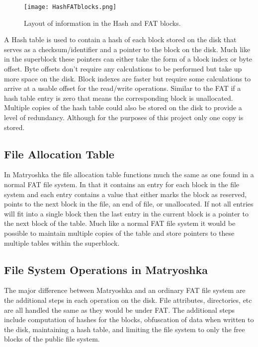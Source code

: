 \documentclass{article}
\begin{document}
\begin{multicols}{2}
\begin{figure*}
  \centering
  \texttt{[image: HashFATblocks.png]}
  \caption{Layout of information in the Hash and FAT blocks.}
  \label{fig:design2}
  \endcenter
\end{figure*}

A Hash table is used to contain a hash of each block stored on the disk that serves as a checksum/identifier and a pointer to the block on the disk. Much like in the superblock these pointers can either take the form of a block index or byte offset. Byte offsets don't require any calculations to be performed but take up more space on the disk. Block indexes are faster but require some calculations to arrive at a usable offset for the read/write operations. Similar to the FAT if a hash table entry is zero that means the corresponding block is unallocated. Multiple copies of the hash table could also be stored on the disk to provide a level of redundancy. Although for the purposes of this project only one copy is stored.

\subsection{File Allocation Table}
In Matryoshka the file allocation table functions much the same as one found in a normal FAT file system. In that it contains an entry for each block in the file system and each entry contains a value that either marks the block as reserved, points to the next block in the file, an end of file, or unallocated. If not all entries will fit into a single block then the last entry in the current block is a pointer to the next block of the table. Much like a normal FAT file system it would be possible to maintain multiple copies of the table and store pointers to these multiple tables within the superblock.

\subsection{File System Operations in Matryoshka}

The major difference between Matryoshka and an ordinary FAT file system are the additional steps in each operation on the disk. File attributes, directories, etc are all handled the same as they would be under FAT. The additional steps include computation of hashes for the blocks, obfuscation of data when written to the disk, maintaining a hash table, and limiting the file system to only the free blocks of the public file system.


\end{multicols}
\end{document}
